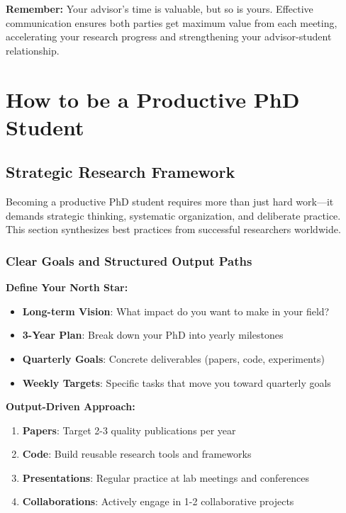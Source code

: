 \documentclass[11pt,a4paper]{article}
\begin{document}
\textbf{Remember:} Your advisor's time is valuable, but so is yours. Effective communication ensures both parties get maximum value from each meeting, accelerating your research progress and strengthening your advisor-student relationship.

\newpage


\newpage

\section{How to be a Productive PhD Student}

\subsection{Strategic Research Framework}

\begin{tcolorbox}[colback=blue!5,colframe=darkblue,title=The Foundation of PhD Success]
Becoming a productive PhD student requires more than just hard work—it demands strategic thinking, systematic organization, and deliberate practice. This section synthesizes best practices from successful researchers worldwide.
\end{tcolorbox}

\subsubsection{Clear Goals and Structured Output Paths}

\textbf{Define Your North Star:}
\begin{itemize}
    \item \textbf{Long-term Vision}: What impact do you want to make in your field?
    \item \textbf{3-Year Plan}: Break down your PhD into yearly milestones
    \item \textbf{Quarterly Goals}: Concrete deliverables (papers, code, experiments)
    \item \textbf{Weekly Targets}: Specific tasks that move you toward quarterly goals
\end{itemize}

\textbf{Output-Driven Approach:}
\begin{enumerate}
    \item \textbf{Papers}: Target 2-3 quality publications per year
    \item \textbf{Code}: Build reusable research tools and frameworks
    \item \textbf{Presentations}: Regular practice at lab meetings and conferences
    \item \textbf{Collaborations}: Actively engage in 1-2 collaborative projects
\end{enumerate}
\end{document}
